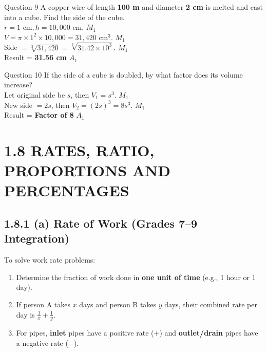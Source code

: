 \documentclass[12pt, a4paper, oneside]{article}
\begin{document}
\begin{solvingbox}{Question 9}
A copper wire of length \textbf{100 m} and diameter \textbf{2 cm} is melted and cast into a cube. Find the side of the cube. \\
$r = 1\text{ cm}, h = 10,000\text{ cm}$. \hfill $M_1$ \\
$V = \pi \times 1^2 \times 10,000 = 31,420\text{ cm}^3$. \hfill $M_1$ \\
Side $= \sqrt[3]{31,420} = \sqrt[3]{31.42 \times 10^3}$. \hfill $M_1$ \\
Result = \textbf{31.56 cm} \hfill $A_1$
\end{solvingbox}

\begin{solvingbox}{Question 10}
If the side of a cube is doubled, by what factor does its volume increase? \\
Let original side be $s$, then $V_1 = s^3$. \hfill $M_1$ \\
New side $= 2s$, then $V_2 = (2s)^3 = 8s^3$. \hfill $M_1$ \\
Result = \textbf{Factor of 8} \hfill $A_1$
\end{solvingbox}

\section*{1.8 RATES, RATIO, PROPORTIONS AND PERCENTAGES}

\subsection*{1.8.1 (a) Rate of Work (Grades 7--9 Integration)}

\begin{tcolorbox}[colback=lightgrey, colframe=primaryblue, title=\textbf{Teacher's Key Concept: The Reciprocal Rule}, arc=5pt]
    To solve work rate problems:
    \begin{enumerate}
        \item Determine the fraction of work done in \textbf{one unit of time} (e.g., 1 hour or 1 day). 
        \item If person A takes $x$ days and person B takes $y$ days, their combined rate per day is $\frac{1}{x} + \frac{1}{y}$.
        \item For pipes, \textbf{inlet} pipes have a positive rate ($+$) and \textbf{outlet/drain} pipes have a negative rate ($-$).
    \end{enumerate}
\end{tcolorbox}
\end{document}
